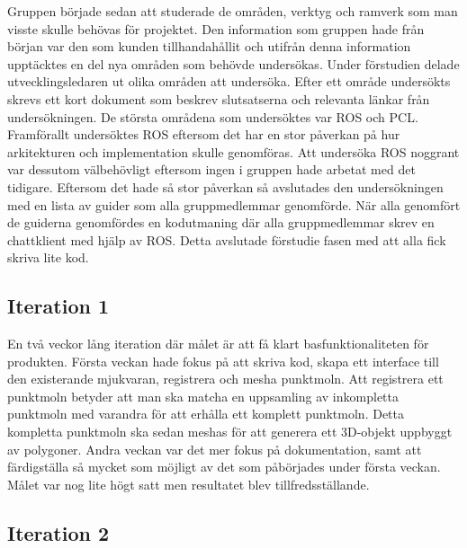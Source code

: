 Gruppen började sedan att studerade de områden, verktyg och ramverk som man visste skulle behövas för projektet. Den information som gruppen hade från början var den som kunden tillhandahållit och utifrån denna information upptäcktes en del nya områden som behövde undersökas. Under förstudien delade utvecklingsledaren ut olika områden att undersöka. Efter ett område undersökts skrevs ett kort dokument som beskrev slutsatserna och relevanta länkar från undersökningen. De största områdena som undersöktes var ROS och PCL. Framförallt undersöktes ROS eftersom det har en stor påverkan på hur arkitekturen och implementation skulle genomföras. Att undersöka ROS noggrant var dessutom välbehövligt eftersom ingen i gruppen hade arbetat med det tidigare. Eftersom det hade så stor påverkan så avslutades den undersökningen med en lista av guider som alla gruppmedlemmar genomförde. När alla genomfört de guiderna genomfördes en kodutmaning där alla gruppmedlemmar skrev en chattklient med hjälp av ROS. Detta avslutade förstudie fasen med att alla fick skriva lite kod. 

\subsection{Iteration 1}

En två veckor lång iteration där målet är att få klart basfunktionaliteten för produkten. Första veckan hade fokus på att skriva kod, skapa ett interface till den existerande mjukvaran, registrera och mesha punktmoln. Att registrera ett punktmoln betyder att man ska matcha en uppsamling av inkompletta punktmoln med varandra för att erhålla ett komplett punktmoln. Detta kompletta punktmoln ska sedan meshas för att generera ett 3D-objekt uppbyggt av polygoner. Andra veckan var det mer fokus på dokumentation, samt att färdigställa så mycket som möjligt av det som påbörjades under första veckan. Målet var nog lite högt satt men resultatet blev tillfredsställande.

\subsection{Iteration 2}

